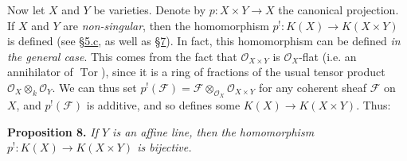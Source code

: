 \documentclass{article}
\newenvironment{itenv}[1]
  {\phantomsection\par\medskip\noindent\textbf{#1.}\itshape}
  {\par\medskip}
\newcommand{\scr}[1]{{\mathscr{#1}}}
\DeclareMathOperator{\Tor}{Tor}
\begin{document}
Now let $X$ and $Y$ be varieties.
Denote by $p\colon X\times Y\to X$ the canonical projection.
If $X$ and $Y$ are \emph{non-singular}, then the homomorphism $p^!\colon K(X)\to K(X\times Y)$ is defined (see \hyperref[subsection5c]{\S5.c}, as well as \hyperref[section7]{\S7}).
In fact, this homomorphism can be defined \emph{in the general case}.
This comes from the fact that $\scr{O}_{X\times Y}$ is $\scr{O}_X$-flat (i.e. an annihilator of $\Tor$), since it is a ring of fractions of the usual tensor product $\scr{O}_X\otimes_k\scr{O}_Y$.
We can thus set $p^!(\scr{F})=\scr{F}\otimes_{\scr{O}_X}\scr{O}_{X\times Y}$ for any coherent sheaf $\scr{F}$ on $X$, and $p^!(\scr{F})$ is additive, and so defines some $K(X)\to K(X\times Y)$.
Thus:

\begin{itenv}{Proposition 8}
\label{proposition8}
  If $Y$ is an affine line, then the homomorphism $p^!\colon K(X)\to K(X\times Y)$ is bijective.
\end{itenv}
\end{document}
